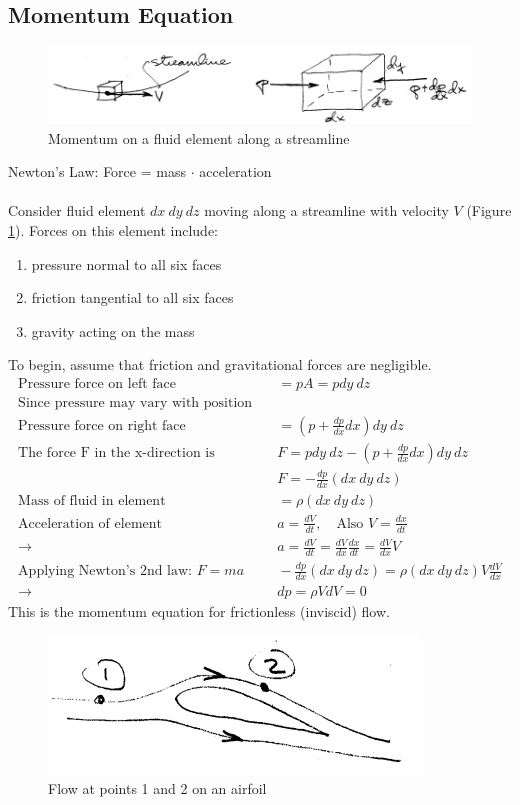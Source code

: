 \documentclass[draft=false, titlepage]{article}
\begin{document}
\subsection{Momentum Equation}
\begin{figure}[ht]
	\centering
	\includegraphics[width=0.8\linewidth]{Figures/p5_momentum.PNG}
	\caption{Momentum on a fluid element along a streamline}
	\label{fig:p5_momentum}
\end{figure}
Newton's Law: Force = mass $\cdot$ acceleration
\paragraph*{} Consider fluid element $dx\ dy\ dz$ moving along a streamline with velocity $V$ (Figure \ref{fig:p5_momentum}). Forces on this element include:
\begin{enumerate}
	\item pressure normal to all six faces
	\item friction tangential to all six faces
	\item gravity acting on the mass
\end{enumerate}
To begin, assume that friction and gravitational forces are negligible.
\begin{align*}
\text{Pressure force on left face} &\quad = pA = p dy\ dz\\
\text{Since pressure may vary with position}&\\
\text{Pressure force on right face} &\quad = (p + \frac{dp}{dx}dx) dy\ dz\\
\text{The force F in the x-direction is}
&\quad F=p dy\ dz - (p + \frac{dp}{dx}dx)dy\ dz\\
&\quad F = -\frac{dp}{dx}(dx\ dy\ dz)\\
\text{Mass of fluid in element} &\quad = \rho (dx\ dy\ dz)\\
\text{Acceleration of element} &\quad a = \frac{dV}{dt},\quad \text{Also } V = \frac{dx}{dt}\\
\rightarrow &\quad a = \frac{dV}{dt} = \frac{dV}{dx}\frac{dx}{dt} = \frac{dV}{dx}V\\
\text{Applying Newton's 2nd law: } F=ma &\quad -\frac{dp}{dx}(dx\ dy\ dz) = \rho(dx\ dy\ dz) V \frac{dV}{dx}\\
\rightarrow &\quad dp = \rho V dV = 0
\end{align*}
This is the momentum equation for frictionless (inviscid) flow.
\begin{figure}[ht]
	\centering
	\includegraphics[width=0.3\linewidth]{Figures/p6_flowOnAirfoil.PNG}
	\caption{Flow at points 1 and 2 on an airfoil}
	\label{fig:p6_flowOnAirfoil}
\end{figure}
\end{document}
